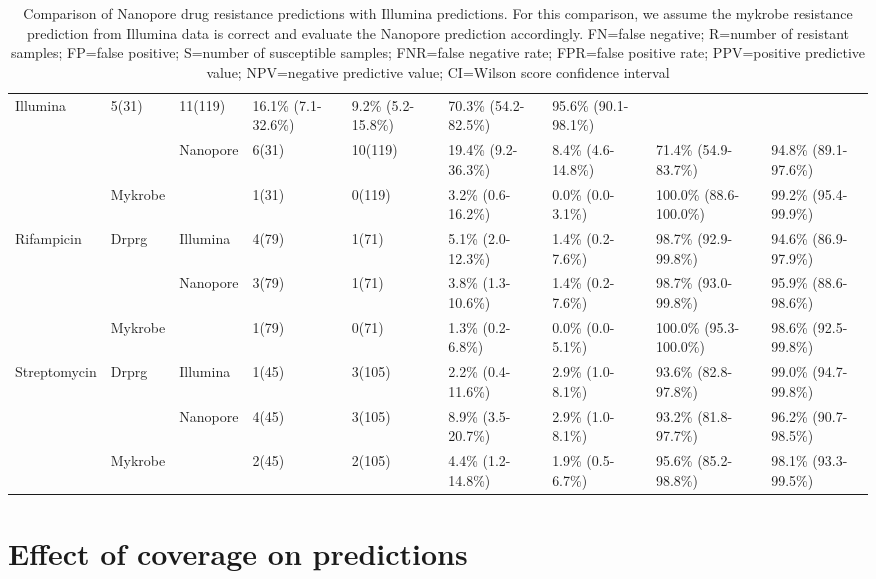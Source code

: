 \begin{table}
{\begin{tabular}{lllllllll}
  Illumina &
  5(31) &
  11(119) &
  16.1\% (7.1-32.6\%) &
  9.2\% (5.2-15.8\%) &
  70.3\% (54.2-82.5\%) &
  95.6\% (90.1-98.1\%) \\
 &
   &
  \multirow{2}{*}{Nanopore} &
  6(31) &
  10(119) &
  19.4\% (9.2-36.3\%) &
  8.4\% (4.6-14.8\%) &
  71.4\% (54.9-83.7\%) &
  94.8\% (89.1-97.6\%) \\
 &
  Mykrobe &
   &
  1(31) &
  0(119) &
  3.2\% (0.6-16.2\%) &
  0.0\% (0.0-3.1\%) &
  100.0\% (88.6-100.0\%) &
  99.2\% (95.4-99.9\%) \\
\multirow{3}{*}{Rifampicin} &
  \multirow{2}{*}{Drprg} &
  Illumina &
  4(79) &
  1(71) &
  5.1\% (2.0-12.3\%) &
  1.4\% (0.2-7.6\%) &
  98.7\% (92.9-99.8\%) &
  94.6\% (86.9-97.9\%) \\
 &
   &
  \multirow{2}{*}{Nanopore} &
  3(79) &
  1(71) &
  3.8\% (1.3-10.6\%) &
  1.4\% (0.2-7.6\%) &
  98.7\% (93.0-99.8\%) &
  95.9\% (88.6-98.6\%) \\
 &
  Mykrobe &
   &
  1(79) &
  0(71) &
  1.3\% (0.2-6.8\%) &
  0.0\% (0.0-5.1\%) &
  100.0\% (95.3-100.0\%) &
  98.6\% (92.5-99.8\%) \\
\multirow{3}{*}{Streptomycin} &
  \multirow{2}{*}{Drprg} &
  Illumina &
  1(45) &
  3(105) &
  2.2\% (0.4-11.6\%) &
  2.9\% (1.0-8.1\%) &
  93.6\% (82.8-97.8\%) &
  99.0\% (94.7-99.8\%) \\
 &
   &
  \multirow{2}{*}{Nanopore} &
  4(45) &
  3(105) &
  8.9\% (3.5-20.7\%) &
  2.9\% (1.0-8.1\%) &
  93.2\% (81.8-97.7\%) &
  96.2\% (90.7-98.5\%) \\
 &
  Mykrobe &
   &
  2(45) &
  2(105) &
  4.4\% (1.2-14.8\%) &
  1.9\% (0.5-6.7\%) &
  95.6\% (85.2-98.8\%) &
  98.1\% (93.3-99.5\%) \\ \cline{2-2} \cline{4-9} 
\end{tabular}%
}
\caption{Comparison of Nanopore drug resistance predictions with Illumina predictions.
For this comparison, we assume the mykrobe resistance prediction from Illumina data is correct and evaluate the Nanopore prediction accordingly.
FN=false negative; R=number of resistant samples; FP=false positive; S=number of susceptible samples; FNR=false negative rate; FPR=false positive rate; PPV=positive predictive value; NPV=negative predictive value; CI=Wilson score confidence interval}
\label{tab:geno-concordance}
\end{table}

\section{Effect of coverage on predictions}

